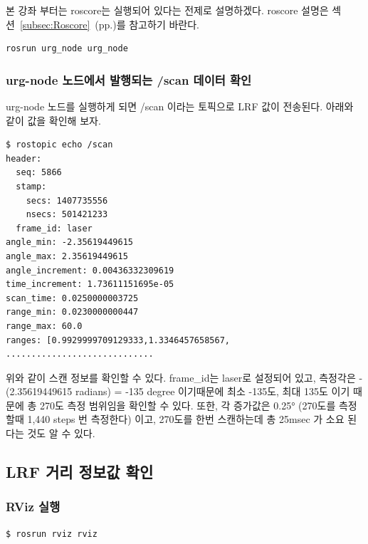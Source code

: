 본 강좌 부터는 roscore는 실행되어 있다는 전제로 설명하겠다. roscore 설명은 섹션~\ref{subsec:Roscore}~(pp.\pageref{subsec:Roscore})를 참고하기 바란다.

\begin{lstlisting}[language=ROS]
rosrun urg_node urg_node 
\end{lstlisting}

\subsubsection{urg-node 노드에서 발행되는 /scan 데이터 확인}

urg-node 노드를 실행하게 되면 /scan 이라는 토픽으로 LRF 값이 전송된다. 아래와 같이 값을 확인해 보자. 

\begin{lstlisting}[language=ROS]
$ rostopic echo /scan
header: 
  seq: 5866
  stamp: 
    secs: 1407735556
    nsecs: 501421233
  frame_id: laser
angle_min: -2.35619449615
angle_max: 2.35619449615
angle_increment: 0.00436332309619
time_increment: 1.73611151695e-05
scan_time: 0.0250000003725
range_min: 0.0230000000447
range_max: 60.0
ranges: [0.9929999709129333,1.3346457658567, .............................
\end{lstlisting}

위와 같이 스캔 정보를 확인할 수 있다. frame\_id는 laser로 설정되어 있고, 측정각은 -(2.35619449615 radians) = -135 degree 이기때문에 최소 -135도, 최대 135도 이기 때문에 총 270도 측정 범위임을 확인할 수 있다. 또한, 각 증가값은 0.25° (270도를 측정할때 1,440 steps 번 측정한다) 이고, 270도를 한번 스캔하는데 총 25msec 가 소요 된다는 것도 알 수 있다.

\subsection{LRF 거리 정보값 확인}

\subsubsection{RViz 실행}

\begin{lstlisting}[language=ROS]
$ rosrun rviz rviz
\end{lstlisting}

